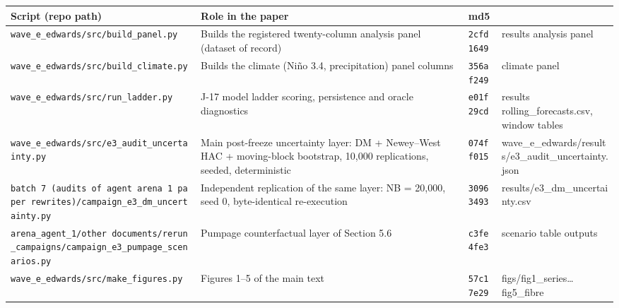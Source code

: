 \documentclass[11pt]{article}
\begin{document}
{\def\LTcaptype{none} %
\begin{longtable}[]{@{}
  >{\raggedright\arraybackslash}p{}
  >{\raggedright\arraybackslash}p{}
  >{\raggedright\arraybackslash}p{}
  >{\raggedright\arraybackslash}p{}@{}}
\toprule\noalign{}
\begin{minipage}[b]{\linewidth}\raggedright
Script (repo path)
\end{minipage} & \begin{minipage}[b]{\linewidth}\raggedright
Role in the paper
\end{minipage} & \begin{minipage}[b]{\linewidth}\raggedright
md5
\end{minipage} & \begin{minipage}[b]{\linewidth}\raggedright
\end{minipage} \\
\midrule\noalign{}
\endhead
\bottomrule\noalign{}
\endlastfoot
\texttt{wave\_e\_edwards/src/build\_panel.py} & Builds the registered
twenty-column analysis panel (dataset of record) & \texttt{2cfd1649} &
results analysis panel \\
\texttt{wave\_e\_edwards/src/build\_climate.py} & Builds the climate
(Niño 3.4, precipitation) panel columns & \texttt{356af249} & climate
panel \\
\texttt{wave\_e\_edwards/src/run\_ladder.py} & J-17 model ladder
scoring, persistence and oracle diagnostics & \texttt{e01f29cd} &
results rolling\_forecasts.csv, window tables \\
\texttt{wave\_e\_edwards/src/e3\_audit\_uncertainty.py} & Main
post-freeze uncertainty layer: DM + Newey--West HAC + moving-block
bootstrap, 10,000 replications, seeded, deterministic &
\texttt{074ff015} &
wave\_e\_edwards/results/e3\_audit\_uncertainty.json \\
\texttt{batch\ 7\ (audits\ of\ agent\ arena\ 1\ paper\ rewrites)/campaign\_e3\_dm\_uncertainty.py}
& Independent replication of the same layer: NB = 20,000, seed 0,
byte-identical re-execution & \texttt{30963493} &
results/e3\_dm\_uncertainty.csv \\
\texttt{arena\_agent\_1/other\ documents/rerun\_campaigns/campaign\_e3\_pumpage\_scenarios.py}
& Pumpage counterfactual layer of Section 5.6 & \texttt{c3fe4fe3} &
scenario table outputs \\
\texttt{wave\_e\_edwards/src/make\_figures.py} & Figures 1--5 of the
main text & \texttt{57c17e29} & figs/fig1\_series\ldots fig5\_fibre \\
\end{longtable}
}
\end{document}
